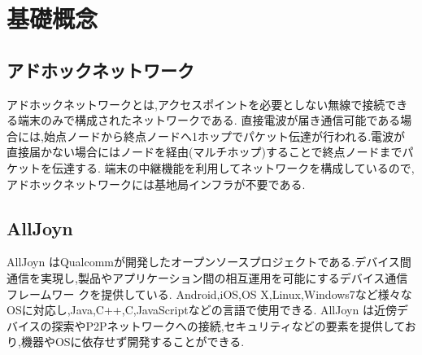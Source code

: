 \chapter{基礎概念}
\label{chap:concept}

\section{アドホックネットワーク}
アドホックネットワークとは,アクセスポイントを必要としない無線で接続できる端末のみで構成されたネットワークである.
直接電波が届き通信可能である場合には,始点ノードから終点ノードへ1ホップでパケット伝達が行われる.電波が直接届かない場合にはノードを経由(マルチホップ)することで終点ノードまでパケットを伝達する.
端末の中継機能を利用してネットワークを構成しているので,アドホックネットワークには基地局インフラが不要である.

\section{AllJoyn}
AllJoyn はQualcommが開発したオープンソースプロジェクトである.デバイス間通信を実現し,製品やアプリケーション間の相互運用を可能にするデバイス通信フレームワー
クを提供している.
Android,iOS,OS X,Linux,Windows7など様々なOSに対応し,Java,C++,C,JavaScriptなどの言語で使用できる.
AllJoyn は近傍デバイスの探索やP2Pネットワークへの接続,セキュリティなどの要素を提供しており,機器やOSに依存せず開発することができる.
